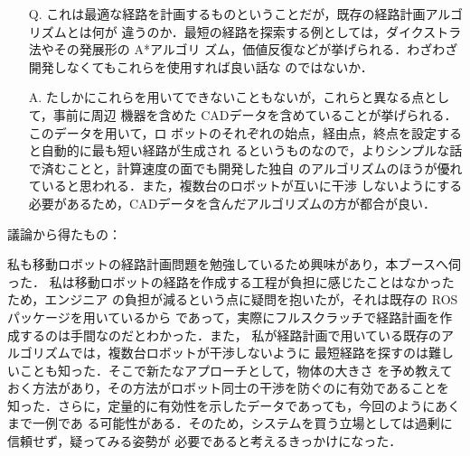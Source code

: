 \documentclass{jsarticle}
\begin{document}
\begin{itemize}
  \item [Q.]これは最適な経路を計画するものということだが，既存の経路計画アルゴリズムとは何が
  \hspace*{5.5zw}違うのか．最短の経路を探索する例としては，ダイクストラ法やその発展形の A*アルゴリ
  \hspace*{5.5zw}ズム，価値反復などが挙げられる．わざわざ開発しなくてもこれらを使用すれば良い話な
  \hspace*{5.5zw}のではないか．
  \vspace*{1zh}

  \item [A.]たしかにこれらを用いてできないこともないが，これらと異なる点として，事前に周辺
  \hspace*{5.5zw}機器を含めた CADデータを含めていることが挙げられる．このデータを用いて，ロ
  \hspace*{5.5zw}ボットのそれぞれの始点，経由点，終点を設定すると自動的に最も短い経路が生成され
  \hspace*{5.5zw}るというものなので，よりシンプルな話で済むことと，計算速度の面でも開発した独自
  \hspace*{5.5zw}のアルゴリズムのほうが優れていると思われる．また，複数台のロボットが互いに干渉
  \hspace*{5.5zw}しないようにする必要があるため，CADデータを含んだアルゴリズムの方が都合が良い．\\
\end{itemize}

\hspace*{4.7zw}議論から得たもの：

\hspace*{5.7zw}私も移動ロボットの経路計画問題を勉強しているため興味があり，本ブースへ伺った．
\hspace*{6.7zw}私は移動ロボットの経路を作成する工程が負担に感じたことはなかったため，エンジニア
\hspace*{6.7zw}の負担が減るという点に疑問を抱いたが，それは既存の ROS パッケージを用いているから
\hspace*{6.7zw}であって，実際にフルスクラッチで経路計画を作成するのは手間なのだとわかった．また，
\hspace*{6.7zw}私が経路計画で用いている既存のアルゴリズムでは，複数台ロボットが干渉しないように
\hspace*{6.7zw}最短経路を探すのは難しいことも知った．そこで新たなアプローチとして，物体の大きさ
\hspace*{6.7zw}を予め教えておく方法があり，その方法がロボット同士の干渉を防ぐのに有効であることを
\hspace*{6.7zw}知った．さらに，定量的に有効性を示したデータであっても，今回のようにあくまで一例であ
\hspace*{6.7zw}る可能性がある．そのため，システムを買う立場としては過剰に信頼せず，疑ってみる姿勢が
\hspace*{6.7zw}必要であると考えるきっかけになった．\\
\end{document}
